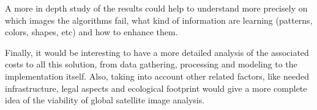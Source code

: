 A more in depth study of the results could help to understand more precisely on which images the algorithms fail, what kind of information are learning (patterns, colors, shapes, etc) and how to enhance them.

Finally, it would be interesting to have a more detailed analysis of the associated costs to all this solution, from data gathering, processing and modeling to the implementation itself. Also, taking into account other related factors, like needed infrastructure, legal aspects and ecological footprint \parencite{Strubell2019} would give a more complete idea of the viability of global satellite image analysis.
